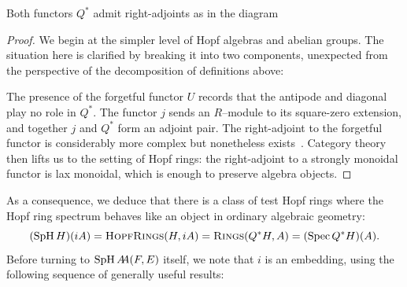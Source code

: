 \begin{corollary}
Both functors \(Q^*\) admit right-adjoints as in the diagram
\begin{center}
\end{center}
\end{corollary}
\begin{proof}
We begin at the simpler level of Hopf algebras and abelian groups.
The situation here is clarified by breaking it into two components, unexpected from the perspective of the decomposition of definitions above:
\begin{center}
\end{center}
The presence of the forgetful functor \(U\) records that the antipode and diagonal play no role in \(Q^*\).
The functor \(j\) sends an \(R\)--module to its square-zero extension, and together \(j\) and \(Q^*\) form an adjoint pair.
The right-adjoint to the forgetful functor is considerably more complex but nonetheless exists~\cite{Fox}.
Category theory then lifts us to the setting of Hopf rings: the right-adjoint to a strongly monoidal functor is lax monoidal, which is enough to preserve algebra objects.
\end{proof}

As a consequence, we deduce that there is a class of test Hopf rings where the Hopf ring spectrum behaves like an object in ordinary algebraic geometry: \[(\operatorname{SpH} H)(iA) = \normalfont\textsc{HopfRings}(H, iA) = \normalfont\textsc{Rings}(Q^* H, A) = (\operatorname{Spec} Q^* H)(A).\]
Before turning to \(\operatorname{SpH} A\!\!A(F, E)\) itself, we note that \(i\) is an embedding, using the following sequence of generally useful results:

